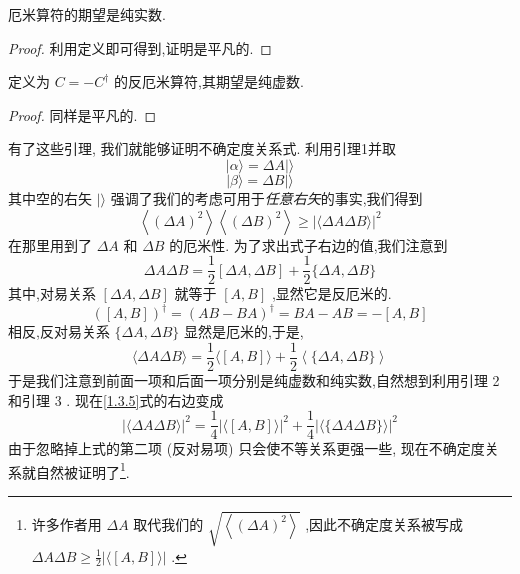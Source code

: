 	\begin{lemma}\label{lem:1.2}
		厄米算符的期望是纯实数.
	\end{lemma}
	\begin{proof}
		利用定义即可得到,证明是平凡的.
	\end{proof}
	\begin{lemma}\label{lem:1.3}
		定义为 $C = - {C}^{ \dagger }$ 的反厄米算符,其期望是纯虚数.
	\end{lemma}
	\begin{proof}
		同样是平凡的.
	\end{proof}
	有了这些引理, 我们就能够证明不确定度关系式. 利用引理1并取
	\begin{equation}
		\left| {\alpha \rangle = {\Delta A}}\right| \rangle
	\end{equation}
	\begin{equation}
		\left| {\beta \rangle = {\Delta B}}\right| \rangle
	\end{equation}
	其中空的右矢 $|\rangle$ 强调了我们的考虑可用于\textit{任意右矢}的事实,我们得到
	\begin{equation}\label{1.3.5}
		\left\langle {\left( \Delta A\right) }^{2}\right\rangle \left\langle {\left( \Delta B\right) }^{2}\right\rangle \geq {\left| \langle \Delta A\Delta B\rangle \right| }^{2}
	\end{equation}
	在那里用到了 ${\Delta A}$ 和 ${\Delta B}$ 的厄米性. 为了求出式子右边的值,我们注意到
	\begin{equation}
		{\Delta A\Delta B} = \frac{1}{2}\left\lbrack {{\Delta A},{\Delta B}}\right\rbrack + \frac{1}{2}\{ {\Delta A},{\Delta B}\}
	\end{equation}
	其中,对易关系 $\left\lbrack {{\Delta A},{\Delta B}}\right\rbrack$ 就等于 $\left\lbrack {A, B}\right\rbrack$ ,显然它是反厄米的.
	\begin{equation}
		{\left( \left\lbrack A, B\right\rbrack \right) }^{\dagger} = {\left( AB - BA\right) }^{\dagger} = {BA} - {AB} = - \left\lbrack {A, B}\right\rbrack
	\end{equation}
	相反,反对易关系 $\{ {\Delta A},{\Delta B}\}$ 显然是厄米的,于是,
	\begin{equation}
		\langle {\Delta A\Delta B}\rangle = \frac{1}{2}\langle \left\lbrack {A, B}\right\rbrack \rangle + \frac{1}{2}\left\langle {\{ {\Delta A},{\Delta B}\} }\right\rangle
	\end{equation}
	于是我们注意到前面一项和后面一项分别是纯虚数和纯实数,自然想到利用引理 2 和引理 3 . 现在\ref{1.3.5}式的右边变成
	\begin{equation}
		{\left| \langle \Delta A\Delta B\rangle \right| }^{2} = \frac{1}{4}{\left| \langle \left\lbrack A, B\right\rbrack \rangle \right| }^{2} + \frac{1}{4}{\left| \langle \{ \Delta A\Delta B\} \rangle \right| }^{2}
	\end{equation}
	由于忽略掉上式的第二项 (反对易项) 只会使不等关系更强一些, 现在不确定度关系就自然被证明了\footnote{许多作者用 ${\Delta A}$ 取代我们的 $\sqrt{\left\langle {\left( \Delta A\right) }^{2}\right\rangle }$ ,因此不确定度关系被写成 ${\Delta A\Delta B} \geq \frac{1}{2}\left| {\langle \left\lbrack {A, B}\right\rbrack \rangle }\right|$ .}.
